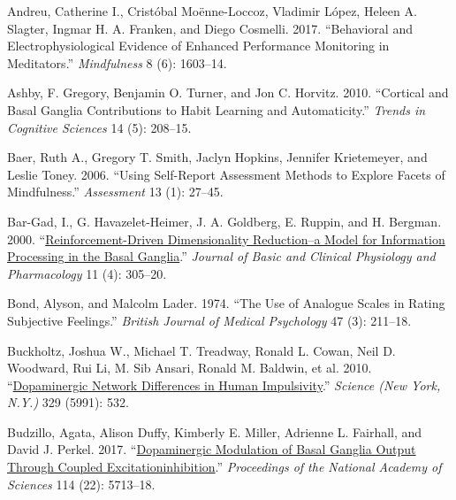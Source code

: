 \documentclass{article}
\newlength{\cslhangindent}
\newlength{\cslentryspacingunit} %
\newenvironment{CSLReferences}[2] %
 {%
  \setlength{\parindent}{0pt}
  \ifodd #1
  \let\oldpar\par
  \def\par{\hangindent=\cslhangindent\oldpar}
  \fi
  \setlength{\parskip}{#2\cslentryspacingunit}
 }%
 {}
\begin{document}
\hypertarget{refs}{}
\begin{CSLReferences}{1}{0}
\leavevmode{}%
Andreu, Catherine I., Cristóbal Moënne-Loccoz, Vladimir López, Heleen A.
Slagter, Ingmar H. A. Franken, and Diego Cosmelli. 2017. {``Behavioral
and {Electrophysiological Evidence} of {Enhanced Performance Monitoring}
in {Meditators}.''} \emph{Mindfulness} 8 (6): 1603--14.

\leavevmode{}%
Ashby, F. Gregory, Benjamin O. Turner, and Jon C. Horvitz. 2010.
{``Cortical and Basal Ganglia Contributions to Habit Learning and
Automaticity.''} \emph{Trends in Cognitive Sciences} 14 (5): 208--15.

\leavevmode{}%
Baer, Ruth A., Gregory T. Smith, Jaclyn Hopkins, Jennifer Krietemeyer,
and Leslie Toney. 2006. {``Using {Self-Report Assessment Methods} to
{Explore Facets} of {Mindfulness}.''} \emph{Assessment} 13 (1): 27--45.

\leavevmode{}%
Bar-Gad, I., G. Havazelet-Heimer, J. A. Goldberg, E. Ruppin, and H.
Bergman. 2000.
{``\href{https://www.ncbi.nlm.nih.gov/pubmed/11248944}{Reinforcement-Driven
Dimensionality Reduction--a Model for Information Processing in the
Basal Ganglia}.''} \emph{Journal of Basic and Clinical Physiology and
Pharmacology} 11 (4): 305--20.

\leavevmode{}%
Bond, Alyson, and Malcolm Lader. 1974. {``The Use of Analogue Scales in
Rating Subjective Feelings.''} \emph{British Journal of Medical
Psychology} 47 (3): 211--18.

\leavevmode{}%
Buckholtz, Joshua W., Michael T. Treadway, Ronald L. Cowan, Neil D.
Woodward, Rui Li, M. Sib Ansari, Ronald M. Baldwin, et al. 2010.
{``\href{https://www.ncbi.nlm.nih.gov/pmc/articles/PMC3161413}{Dopaminergic
Network Differences in Human Impulsivity}.''} \emph{Science (New York,
N.Y.)} 329 (5991): 532.

\leavevmode{}%
Budzillo, Agata, Alison Duffy, Kimberly E. Miller, Adrienne L. Fairhall,
and David J. Perkel. 2017.
{``\href{https://www.ncbi.nlm.nih.gov/pubmed/28507134}{Dopaminergic
Modulation of Basal Ganglia Output Through Coupled
Excitation\textendash inhibition}.''} \emph{Proceedings of the National
Academy of Sciences} 114 (22): 5713--18.


\end{CSLReferences}
\end{document}
